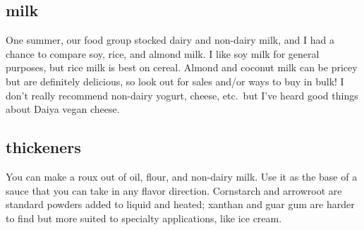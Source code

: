 \subsection{milk}
One summer, our food group stocked dairy and non-dairy milk, and I had a chance to compare soy, rice, and almond milk. I like soy milk for general purposes, but rice milk is best on cereal. Almond and coconut milk can be pricey but are definitely delicious, so look out for sales and/or ways to buy in bulk! I don't really recommend non-dairy yogurt, cheese, etc.\ but I've heard good things about Daiya vegan cheese.

\subsection{thickeners}
You can make a roux out of oil, flour, and non-dairy milk. Use it as the base of a sauce that you can take in any flavor direction. Cornstarch and arrowroot are standard powders added to liquid and heated; xanthan and guar gum are harder to find but more suited to specialty applications, like ice cream.




